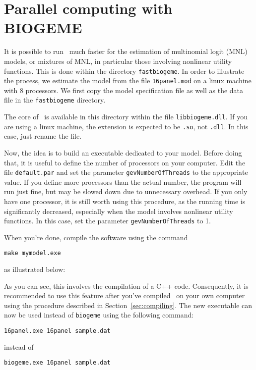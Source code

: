 \documentclass[12pt]{memoir}
\begin{document}
\section{Parallel computing with BIOGEME}

It is possible to run \BIOGEME\ much faster for the estimation of
multinomial logit (MNL) models, or mixtures of MNL, in particular
those involving nonlinear utility functions.  This is done within the
directory \texttt{fastbiogeme}. In order to illustrate the process, we
estimate the model from the file \texttt{16panel.mod} on a linux
machine with 8 processors. We first copy
the model specification file as well as the data file in the \texttt{fastbiogeme}
directory. 

\begin{center}
\end{center}

The core of \BIOGEME\ is available in this directory within the file
\texttt{libbiogeme.dll}. If you are using a linux machine, the
extension is expected to be \texttt{.so}, not \texttt{.dll}. In this
case, just rename the file.

\begin{center}
\end{center}

Now, the idea is to build an executable dedicated to your
model. Before doing that, it is useful to define the number of
processors on your computer. Edit the file \texttt{default.par} and
set the parameter \texttt{gevNumberOfThreads} to the appropriate
value. If you define more processors than the actual number, the
program will run just fine, but may be slowed down due to unnecessary
overhead. If you only have one processor, it is still worth using this
procedure, as the running time is significantly decreased, especially
when the model involves nonlinear utility functions.  In this case,
set the parameter  \texttt{gevNumberOfThreads} to 1.

When you're done, compile the software   using
the command
{\footnotesize
\begin{verbatim}
make mymodel.exe
\end{verbatim}
}
as illustrated below:
\begin{center}
\end{center}

As you can see, this involves the compilation of a C++
code. Consequently, it is recommended to use this feature after you've
compiled \BIOGEME\ on your own computer using the procedure described
in Section~\ref{sec:compiling}. 
The new executable can now be used instead of \texttt{biogeme} using
the following command:
{\footnotesize
\begin{verbatim}
16panel.exe 16panel sample.dat
\end{verbatim}
}
instead of 
{\footnotesize
\begin{verbatim}
biogeme.exe 16panel sample.dat
\end{verbatim}
}
\end{document}
